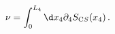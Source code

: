\begin{equation}
\label{top-charge2}
\nu = \int_0^{L_4} \d x_4 \partial_4 S_{\mathrm CS} (x_4) \, .
\end{equation}

